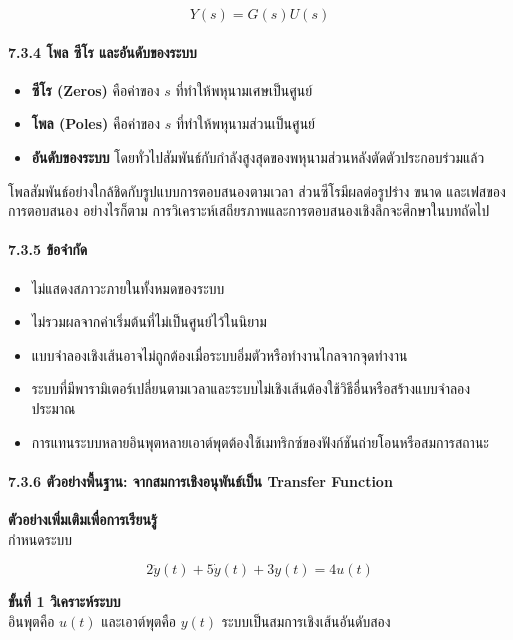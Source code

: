\[
Y(s)=G(s)U(s)
\]

\paragraph{7.3.4 โพล ซีโร และอันดับของระบบ}

\begin{itemize}
    \item \textbf{ซีโร (Zeros)} คือค่าของ $s$ ที่ทำให้พหุนามเศษเป็นศูนย์
    \item \textbf{โพล (Poles)} คือค่าของ $s$ ที่ทำให้พหุนามส่วนเป็นศูนย์
    \item \textbf{อันดับของระบบ} โดยทั่วไปสัมพันธ์กับกำลังสูงสุดของพหุนามส่วนหลังตัดตัวประกอบร่วมแล้ว
\end{itemize}

โพลสัมพันธ์อย่างใกล้ชิดกับรูปแบบการตอบสนองตามเวลา ส่วนซีโรมีผลต่อรูปร่าง ขนาด และเฟสของการตอบสนอง อย่างไรก็ตาม การวิเคราะห์เสถียรภาพและการตอบสนองเชิงลึกจะศึกษาในบทถัดไป

\paragraph{7.3.5 ข้อจำกัด}

\begin{itemize}
    \item ไม่แสดงสภาวะภายในทั้งหมดของระบบ
    \item ไม่รวมผลจากค่าเริ่มต้นที่ไม่เป็นศูนย์ไว้ในนิยาม
    \item แบบจำลองเชิงเส้นอาจไม่ถูกต้องเมื่อระบบอิ่มตัวหรือทำงานไกลจากจุดทำงาน
    \item ระบบที่มีพารามิเตอร์เปลี่ยนตามเวลาและระบบไม่เชิงเส้นต้องใช้วิธีอื่นหรือสร้างแบบจำลองประมาณ
    \item การแทนระบบหลายอินพุตหลายเอาต์พุตต้องใช้เมทริกซ์ของฟังก์ชันถ่ายโอนหรือสมการสถานะ
\end{itemize}

\paragraph{7.3.6 ตัวอย่างพื้นฐาน: จากสมการเชิงอนุพันธ์เป็น Transfer Function}

\textbf{ตัวอย่างเพิ่มเติมเพื่อการเรียนรู้}\\กำหนดระบบ

\[
2\ddot{y}(t)+5\dot{y}(t)+3y(t)=4u(t)
\]

\textbf{ขั้นที่ 1 วิเคราะห์ระบบ}\\อินพุตคือ $u(t)$ และเอาต์พุตคือ $y(t)$ ระบบเป็นสมการเชิงเส้นอันดับสอง

